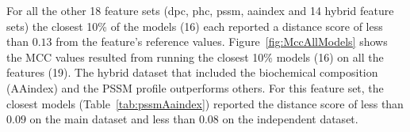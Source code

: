 For all the other 18 feature sets (dpc, phc, pssm, aaindex and 14 hybrid feature sets) the closest 10\% of the models (16) 
each reported a distance score of less than $0.13$ from the feature's reference values. 
Figure~\ref{fig:MccAllModels} shows the MCC values resulted from running 
the closest 10\% models (16) on all the features (19). 
The hybrid dataset that included the biochemical composition (AAindex) and the PSSM profile 
outperforms others. For this feature set, the closest models (Table~\ref{tab:pssmAaindex}) reported 
the distance score of less than $0.09$ on the main dataset and less than $0.08$ on the independent dataset.


